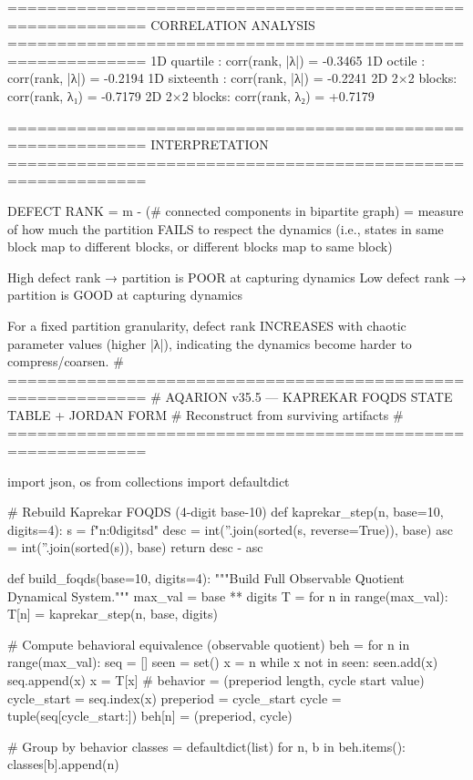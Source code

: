 {{{{{{{{{{{{{============================================================
CORRELATION ANALYSIS
============================================================
  1D quartile  : corr(rank, |λ|) = -0.3465
  1D octile    : corr(rank, |λ|) = -0.2194
  1D sixteenth : corr(rank, |λ|) = -0.2241
  2D 2×2 blocks: corr(rank, λ₁) = -0.7179
  2D 2×2 blocks: corr(rank, λ₂) = +0.7179

============================================================
INTERPRETATION
============================================================

DEFECT RANK = m - (# connected components in bipartite graph)
            = measure of how much the partition FAILS to respect
              the dynamics (i.e., states in same block map to
              different blocks, or different blocks map to same block)

High defect rank → partition is POOR at capturing dynamics
Low defect rank  → partition is GOOD at capturing dynamics

For a fixed partition granularity, defect rank INCREASES with
chaotic parameter values (higher |λ|), indicating the dynamics
become harder to compress/coarsen.
# ============================================================
# AQARION v35.5 — KAPREKAR FOQDS STATE TABLE + JORDAN FORM
# Reconstruct from surviving artifacts
# ============================================================

import json, os
from collections import defaultdict

# Rebuild Kaprekar FOQDS (4-digit base-10)
def kaprekar_step(n, base=10, digits=4):
    s = f"{n:0{digits}d}"
    desc = int(''.join(sorted(s, reverse=True)), base)
    asc = int(''.join(sorted(s)), base)
    return desc - asc

def build_foqds(base=10, digits=4):
    """Build Full Observable Quotient Dynamical System."""
    max_val = base ** digits
    T = {}
    for n in range(max_val):
        T[n] = kaprekar_step(n, base, digits)
    
    # Compute behavioral equivalence (observable quotient)
    beh = {}
    for n in range(max_val):
        seq = []
        seen = set()
        x = n
        while x not in seen:
            seen.add(x)
            seq.append(x)
            x = T[x]
        # behavior = (preperiod length, cycle start value)
        cycle_start = seq.index(x)
        preperiod = cycle_start
        cycle = tuple(seq[cycle_start:])
        beh[n] = (preperiod, cycle)
    
    # Group by behavior
    classes = defaultdict(list)
    for n, b in beh.items():
        classes[b].append(n)
    
}}}}}}}}}}}}}
